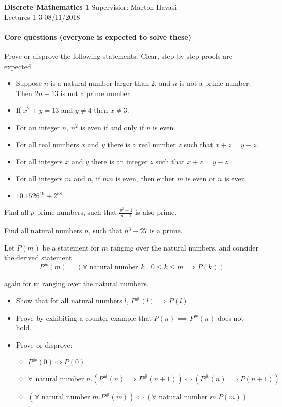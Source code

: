 \documentclass{exam}
\begin{document}
\noindent
\large\textbf{Discrete Mathematics 1} \hfill Supervisior: Marton Havasi \\
\normalsize Lectures 1-3 \hfill 08/11/2018

\paragraph{Core questions (everyone is expected to solve these)}
\begin{questions}
\question Prove or disprove the following statements. Clear, step-by-step proofs are expected.
\begin{itemize}
\item Suppose $n$ is a natural number larger than 2, and $n$ is not a prime number. Then $2n + 13$ is not a prime
number.

\item If $x^2+y = 13$ and $y\neq 4$ then $x\neq 3$.

\item For an integer $n$, $n^2$ is even if and only if $n$ is even.

\item For all real numbers $x$ and $y$ there is a real number $z$ such that $x + z = y - z$.

\item For all integers $x$ and $y$ there is an integer $z$ such that $x + z = y - z$.

\item For all integers $m$ and $n$, if $mn$ is even, then either $m$ is even or $n$ is even.

\item $10|1526^{19}+2^{58}$
\end{itemize}


\question Find all $p$ prime numbers, such that $\frac{p^2-1}{p-1}$ is also prime. 

\question Find all natural numbers $n$, such that $n^3-27$ is a prime.

\question Let $P(m)$ be a statement for $m$ ranging over the natural numbers, and consider the derived statement $$P^\#(m)=(\forall \text{ natural number } k \text{ . } 0 \leq k \leq m \implies P(k))$$ 

again for m ranging over the natural numbers.

\begin{itemize}
\item Show that for all natural numbers $l$, $P^\#(l)\implies P(l)$
\item Prove by exhibiting a counter-example that $P(n)\implies P^\#(n)$ does not hold.
\item Prove or disprove:
\begin{itemize}
\item $P^\#(0) \iff P(0)$
\item $\forall \text{ natural number } n. (P^\#(n) \implies P^\#(n+1)) \iff (P^\#(n) \implies P(n+1)) $
\item $(\forall \text{ natural number } m.P^\#(m) ) \iff (\forall \text{ natural number } m.P(m) )$
\end{itemize}
\end{itemize}


\end{questions}
\end{document}
